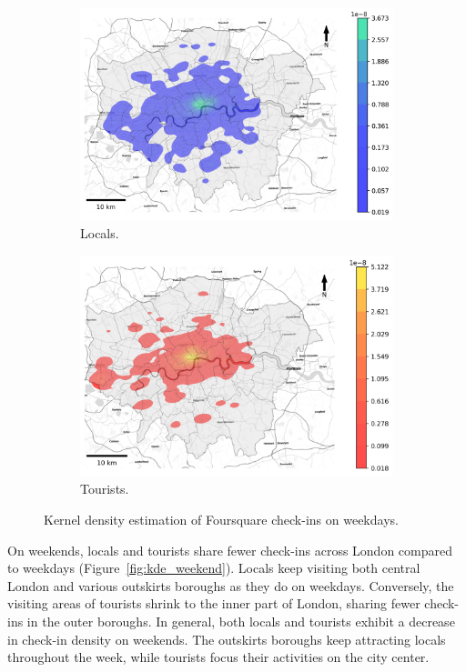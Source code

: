 \documentclass{article}
\theoremstyle{remark}
\begin{document}
\begin{figure}[!h]

\begin{subfigure}{0.5\textwidth}
\includegraphics[width=1\linewidth]{figures/kde_locals_weekday.png} 
\caption{Locals.}
\label{fig:kde_locals_weekday}
\end{subfigure}
\begin{subfigure}{0.5\textwidth}
\includegraphics[width=1\linewidth]{figures/kde_tourists_weekday.png}
\caption{Tourists.}
\label{fig:kde_tourists_weekday}
\end{subfigure}

\caption{Kernel density estimation of Foursquare check-ins on weekdays.} \label{fig:kde_weekday}
\end{figure}

On weekends, locals and tourists share fewer check-ins across London compared to weekdays (Figure~\ref{fig:kde_weekend}). Locals keep visiting both central London and various outskirts boroughs as they do on weekdays.  Conversely, the visiting areas of tourists shrink to the inner part of London, sharing fewer check-ins in the outer boroughs. In general, both locals and tourists exhibit a decrease in check-in density on weekends. The outskirts boroughs keep attracting locals throughout the week, while tourists focus their activities on the city center.
\end{document}
